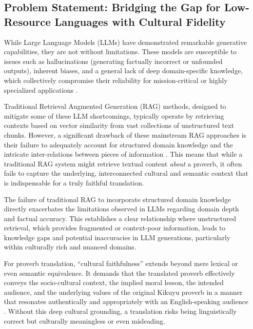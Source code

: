 \documentclass[12pt]{article}
\let\cite\textcite  %
\begin{document}
\subsection{Problem Statement: Bridging the Gap for Low-Resource Languages with Cultural Fidelity}

While Large Language Models (LLMs) have demonstrated remarkable generative capabilities, they are not without limitations. These models are susceptible to issues such as hallucinations (generating factually incorrect or unfounded outputs), inherent biases, and a general lack of deep domain-specific knowledge, which collectively compromise their reliability for mission-critical or highly specialized applications \cite{openai2023llm}. 

Traditional Retrieval Augmented Generation (RAG) methods, designed to mitigate some of these LLM shortcomings, typically operate by retrieving contexts based on vector similarity from vast collections of unstructured text chunks. However, a significant drawback of these mainstream RAG approaches is their failure to adequately account for structured domain knowledge and the intricate inter-relations between pieces of information \cite{googleai2023rag, chen2024og}. This means that while a traditional RAG system might retrieve textual content \emph{about} a proverb, it often fails to capture the underlying, interconnected cultural and semantic context that is indispensable for a truly faithful translation.

The failure of traditional RAG to incorporate structured domain knowledge directly exacerbates the limitations observed in LLMs regarding domain depth and factual accuracy. This establishes a clear relationship where unstructured retrieval, which provides fragmented or context-poor information, leads to knowledge gaps and potential inaccuracies in LLM generations, particularly within culturally rich and nuanced domains. 

For proverb translation, ``cultural faithfulness'' extends beyond mere lexical or even semantic equivalence. It demands that the translated proverb effectively conveys the socio-cultural context, the implied moral lesson, the intended audience, and the underlying values of the original Kikuyu proverb in a manner that resonates authentically and appropriately with an English-speaking audience \cite{smith2023cultural}. Without this deep cultural grounding, a translation risks being linguistically correct but culturally meaningless or even misleading.

\end{document}
